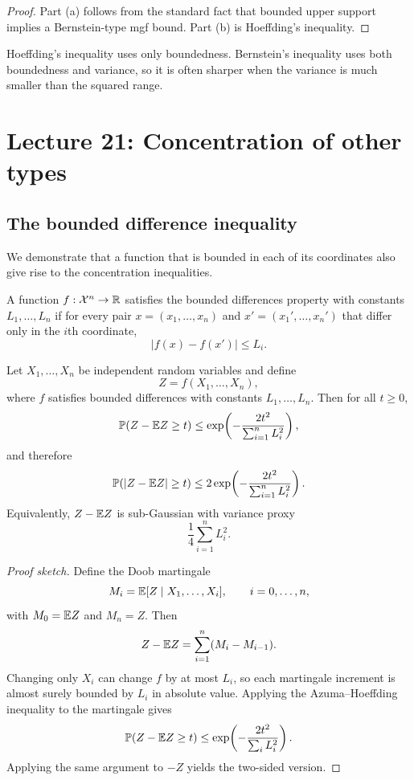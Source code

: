 \begin{proof}
Part (a) follows from the standard fact that bounded upper support implies a Bernstein-type mgf bound. Part (b) is Hoeffding's inequality.
\end{proof}

\begin{remark}
Hoeffding's inequality uses only boundedness. Bernstein's inequality uses both boundedness and variance, so it is often sharper when the variance is much smaller than the squared range.
\end{remark}

\section{Lecture 21: Concentration of other types}
\subsection{The bounded difference inequality}
We demonstrate that a function that is bounded in each of its coordinates also give rise to the concentration inequalities.
\begin{de}
A function $f:\mathcal{X}^n\to\mathbb{R}$ satisfies the bounded differences property with constants $L_1,\dots,L_n$ if for every pair
$x=(x_1,\dots,x_n)$ and $x'=(x_1',\dots,x_n')$ that differ only in the $i$th coordinate,
\[
|f(x)-f(x')|\le L_i.
\]
\end{de}

\begin{thm}
Let $X_1,\dots,X_n$ be independent random variables and define
\[
Z=f(X_1,\dots,X_n),
\]
where $f$ satisfies bounded differences with constants $L_1,\dots,L_n$. Then for all $t\ge 0$,
\[
\mathbb{P}(Z-\mathbb{E} Z\ge t)
\le
\exp\!\left(
-\frac{2t^2}{\sum_{i=1}^n L_i^2}
\right),
\]
and therefore
\[
\mathbb{P}(|Z-\mathbb{E} Z|\ge t)
\le
2\exp\!\left(
-\frac{2t^2}{\sum_{i=1}^n L_i^2}
\right).
\]
Equivalently, $Z-\mathbb{E} Z$ is sub-Gaussian with variance proxy
\[
\frac14 \sum_{i=1}^n L_i^2.
\]
\end{thm}

\begin{proof}[Proof sketch]
Define the Doob martingale
\[
M_i=\mathbb{E}[Z\mid X_1,\dots,X_i],\qquad i=0,\dots,n,
\]
with $M_0=\mathbb{E} Z$ and $M_n=Z$. Then
\[
Z-\mathbb{E} Z = \sum_{i=1}^n (M_i-M_{i-1}).
\]
Changing only $X_i$ can change $f$ by at most $L_i$, so each martingale increment is almost surely bounded by $L_i$ in absolute value. Applying the Azuma--Hoeffding inequality to the martingale gives
\[
\mathbb{P}(Z-\mathbb{E} Z\ge t)
\le
\exp\!\left(-\frac{2t^2}{\sum_i L_i^2}\right).
\]
Applying the same argument to $-Z$ yields the two-sided version.
\end{proof}

